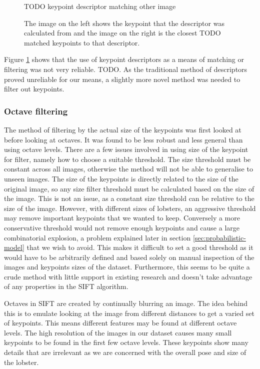 \begin{figure}[H]
\centering
TODO keypoint descriptor matching other image
\caption{The image on the left shows the keypoint that the descriptor was calculated from and the image on the right is the closest TODO matched keypoints to that descriptor.}
\label{fig:kp-descriptor}
\end{figure}
\noindent
Figure \ref{fig:kp-descriptor} shows that the use of keypoint descriptors as a means of matching or filtering was not very reliable. TODO. As the traditional method of descriptors proved unreliable for our means, a slightly more novel method was needed to filter out keypoints.

\subsubsection{Octave filtering}
The method of filtering by the actual size of the keypoints was first looked at before looking at octaves. It was found to be less robust and less general than using octave levels. There are a few issues involved in using size of the keypoint for filter, namely how to choose a suitable threshold. The size threshold must be constant across all images, otherwise the method will not be able to generalise to unseen images. The size of the keypoints is directly related to the size of the original image, so any size filter threshold must be calculated based on the size of the image. This is not an issue, as a constant size threshold can be relative to the size of the image. However, with different sizes of lobsters, an aggressive threshold may remove important keypoints that we wanted to keep. Conversely a more conservative threshold would not remove enough keypoints and cause a large combinatorial explosion, a problem explained later in section \ref{sec:probabilistic-model} that we wish to avoid. This makes it difficult to set a good threshold as it would have to be arbitrarily defined and based solely on manual inspection of the images and keypoints sizes of the dataset. Furthermore, this seems to be quite a crude method with little support in existing research and doesn't take advantage of any properties in the SIFT algorithm. 

Octaves in SIFT are created by continually blurring an image. The idea behind this is to emulate looking at the image from different distances to get a varied set of keypoints. This means different features may be found at different octave levels. The high resolution of the images in our dataset causes many small keypoints to be found in the first few octave levels. These keypoints show many details that are irrelevant as we are concerned with the overall pose and size of the lobster.

